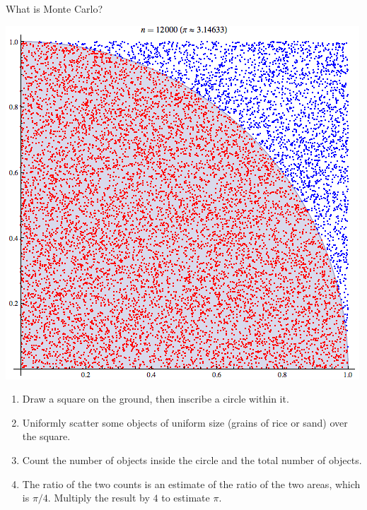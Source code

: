 \documentclass[11pt]{beamer}
\begin{document}
\begin{frame}{What is Monte Carlo?}
\noindent\begin{minipage}{0.5\textwidth}%
\includegraphics[width=\linewidth]{img/pi_greco_2.png}
\end{minipage}%
\hfill%
\begin{minipage}{0.5\textwidth}
\begin{enumerate}
\item Draw a square on the ground, then inscribe a circle within it.
\item Uniformly scatter some objects of uniform size (grains of rice or sand) over the square.
\item Count the number of objects inside the circle and the total number of objects.
\item The ratio of the two counts is an estimate of the ratio of the two areas, which is $\pi/4$. Multiply the result by $4$ to estimate $\pi$.
\end{enumerate}
\end{minipage}
\end{frame}
\end{document}
